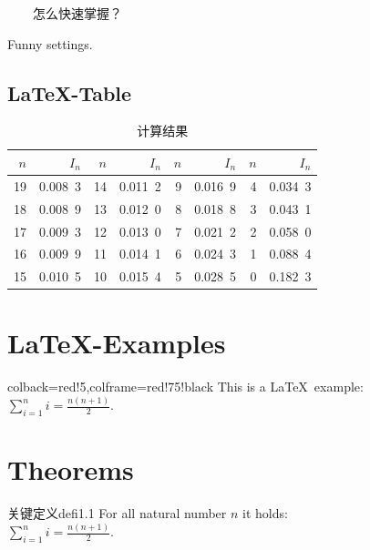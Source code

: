 \begin{tcolorbox}[colback=yellow!10,colframe=red!75!black,title=小窍门]
~~~~怎么快速掌握？
\end{tcolorbox}


\begin{tcolorbox}[colback=blue!50,colframe=blue!25!black,coltext=yellow,
    fontupper=\Large\bfseries,arc=6mm,boxrule=2mm,boxsep=5mm]
  Funny settings.
\end{tcolorbox}

\subsection{\LaTeX-Table}

\begin{table}[h]\begin{center}\color{darkblue}\caption{计算结果}\color{black}\label{tab1-2}
{\footnotesize
\begin{tabular}{r|r||r|r||r|r||r|r}\arrayrulecolor{darkblue}\hline\rowcolor{lightblue}
  $n$&$I_n$&$n$&$I_n$&$n$&$I_n$&$n$&$I_n$\\\hline
  19&0.008\ 3&14&0.011\ 2&9&0.016\ 9&4&0.034\ 3\\
  18&0.008\ 9&13&0.012\ 0&8&0.018\ 8&3&0.043\ 1\\
  17&0.009\ 3&12&0.013\ 0&7&0.021\ 2&2&0.058\ 0\\
  16&0.009\ 9&11&0.014\ 1&6&0.024\ 3&1&0.088\ 4\\
  15&0.010\ 5&10&0.015\ 4&5&0.028\ 5&0&0.182\ 3\\\hline
 \end{tabular}}\end{center}\end{table}


\section{\LaTeX-Examples}

\begin{tcblisting}{colback=red!5,colframe=red!75!black}
This is a \LaTeX\ example:
$\displaystyle\sum\limits_{i=1}^n i = \frac{n(n+1)}{2}$.
\end{tcblisting}


\section{Theorems}

\begin{defi}{关键定义}{defi1.1}
  For all natural number $n$ it holds:\\[2mm]
  $\displaystyle\sum\limits_{i=1}^n i = \frac{n(n+1)}{2}$.
\end{defi}

